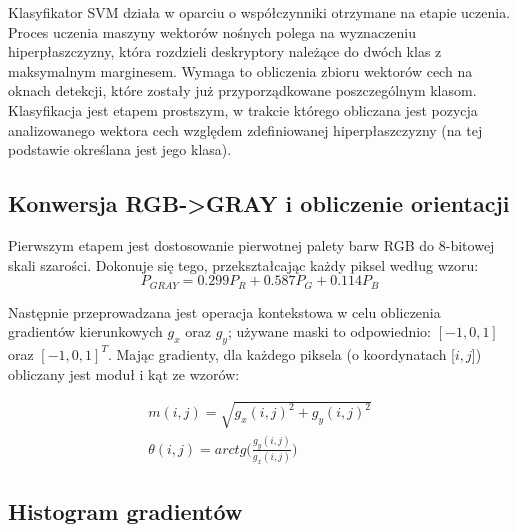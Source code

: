 Klasyfikator SVM działa w oparciu o współczynniki otrzymane na etapie uczenia. Proces uczenia maszyny wektorów nośnych polega na wyznaczeniu hiperpłaszczyzny, która rozdzieli deskryptory należące do dwóch klas z maksymalnym marginesem. Wymaga to obliczenia zbioru wektorów cech na oknach detekcji, które zostały już przyporządkowane poszczególnym klasom.
Klasyfikacja jest etapem prostszym, w trakcie którego obliczana jest pozycja analizowanego wektora cech względem zdefiniowanej hiperpłaszczyzny (na tej podstawie określana jest jego klasa).




\subsection{Konwersja RGB->GRAY i obliczenie orientacji} 
\label{sec:HOGgrad}
Pierwszym etapem jest dostosowanie pierwotnej palety barw RGB do 8-bitowej skali szarości. 
Dokonuje się tego, przekształcając każdy piksel według wzoru:
\begin{equation}
\label{eq:rgb2gray}
P_{GRAY}=0.299P_R + 0.587P_G + 0.114P_B 
\end{equation}


Następnie przeprowadzana jest operacja kontekstowa w celu obliczenia gradientów kierunkowych $g_x$ oraz $g_y$; używane maski to odpowiednio: $[-1,0,1]$ oraz $[-1,0,1]^T$. 
Mając gradienty, dla każdego piksela (o koordynatach [$i,j$]) obliczany jest moduł i kąt ze wzorów:

\begin{equation}
\label{eq:HOGangles}
\left.\begin{aligned}
m(i,j)=\sqrt{g_x(i,j)^2+g_y(i,j)^2} \\
\theta(i,j)=arctg\bigg(\frac{g_y(i,j)}{g_x(i,j)}\bigg)
\end{aligned}\right.
\end{equation}

\subsection{Histogram gradientów}

